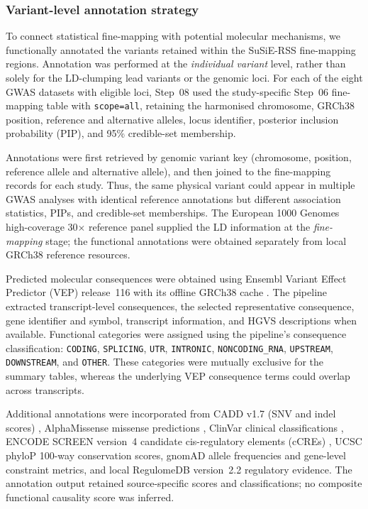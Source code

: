 \documentclass[11pt,a4paper]{article}
\begin{document}
\subsubsection{Variant-level annotation strategy}

To connect statistical fine-mapping with potential molecular
mechanisms, we functionally annotated the variants retained
within the SuSiE-RSS fine-mapping regions. Annotation was
performed at the \emph{individual variant} level, rather than
solely for the LD-clumping lead variants or the genomic loci.
For each of the eight GWAS datasets with eligible loci, Step~08
used the study-specific Step~06 fine-mapping table with
\texttt{scope=all}, retaining the harmonised chromosome,
GRCh38 position, reference and alternative alleles, locus
identifier, posterior inclusion probability (PIP), and
95\% credible-set membership.

Annotations were first retrieved by genomic variant key
(chromosome, position, reference allele and alternative allele), and then
joined to the fine-mapping records for each study. Thus, the
same physical variant could appear in multiple GWAS analyses
with identical reference annotations but different association
statistics, PIPs, and credible-set memberships. The European
1000 Genomes high-coverage 30$\times$ reference panel supplied
the LD information at the \emph{fine-mapping} stage; the functional
annotations were obtained separately from local GRCh38
reference resources.

Predicted molecular consequences were obtained using Ensembl
Variant Effect Predictor (VEP) release~116 with its offline
GRCh38 cache \cite{McLaren2016}. The pipeline extracted
transcript-level consequences, the selected representative
consequence, gene identifier and symbol, transcript information,
and HGVS descriptions when available. Functional categories
were assigned using the pipeline's consequence classification:
\texttt{CODING}, \texttt{SPLICING}, \texttt{UTR},
\texttt{INTRONIC}, \texttt{NONCODING\_RNA}, \texttt{UPSTREAM},
\texttt{DOWNSTREAM}, and \texttt{OTHER}. These categories were
mutually exclusive for the summary tables, whereas the
underlying VEP consequence terms could overlap across transcripts.

Additional annotations were incorporated from CADD v1.7
(SNV and indel scores) \cite{Rentzsch2019}, AlphaMissense
missense predictions \cite{Cheng2023}, ClinVar clinical
classifications \cite{Landrum2018}, ENCODE SCREEN version~4
candidate cis-regulatory elements (cCREs) \cite{ENCODE2020},
UCSC phyloP 100-way conservation scores, gnomAD allele
frequencies and gene-level constraint metrics, and local
RegulomeDB version~2.2 regulatory evidence. The annotation
output retained source-specific scores and classifications;
no composite functional causality score was inferred.
\end{document}
